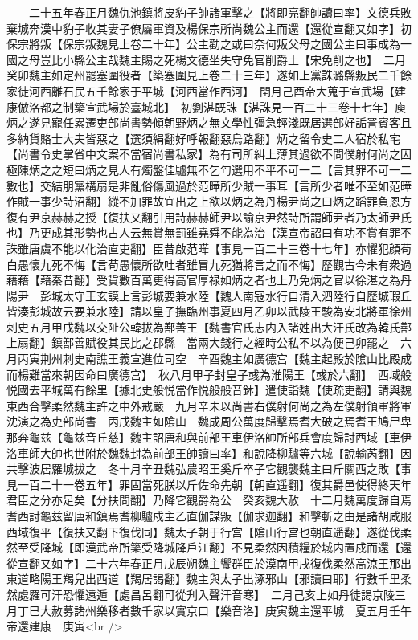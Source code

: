 　　二十五年春正月魏仇池鎮將皮豹子帥諸軍擊之【將即亮翻帥讀曰率】文德兵敗棄城奔漢中豹子收其妻子僚屬軍資及楊保宗所尚魏公主而還【還從宣翻又如字】初保宗將叛【保宗叛魏見上卷二十年】公主勸之或曰奈何叛父母之國公主曰事成為一國之母豈比小縣公主哉魏主賜之死楊文德坐失守免官削爵土【宋免削之也】　二月癸卯魏主如定州罷塞圍役者【築塞圍見上卷二十三年】遂如上黨誅潞縣叛民二千餘家徙河西離石民五千餘家于平城【河西當作西河】　閏月己酉帝大蒐于宣武場【建康倣洛都之制築宣武場於臺城北】　初劉湛既誅【湛誅見一百二十三卷十七年】庾炳之遂見寵任累遷吏部尚書勢傾朝野炳之無文學性彊急輕淺既居選部好詬詈賓客且多納貨賂士大夫皆惡之【選須絹翻好呼報翻惡烏路翻】炳之留令史二人宿於私宅【尚書令史掌省中文案不當宿尚書私家】為有司所糾上薄其過欲不問僕射何尚之因極陳炳之之短曰炳之見人有燭盤佳驢無不乞匄選用不平不可一二【言其罪不可一二數也】交結朋黨構扇是非亂俗傷風過於范曄所少賊一事耳【言所少者唯不至如范曄作賊一事少詩沼翻】縱不加罪故宜出之上欲以炳之為丹楊尹尚之曰炳之蹈罪負恩方復有尹京赫赫之授【復扶又翻引用詩赫赫師尹以諭京尹然詩所謂師尹者乃太師尹氏也】乃更成其形勢也古人云無賞無罰雖堯舜不能為治【漢宣帝詔曰有功不賞有罪不誅雖唐虞不能以化治直吏翻】臣昔啟范曄【事見一百二十三卷十七年】亦懼犯顔苟白愚懷九死不悔【言苟愚懷所欲吐者雖冒九死猶將言之而不悔】歷觀古今未有衆過藉藉【藉秦昔翻】受貨數百萬更得高官厚禄如炳之者也上乃免炳之官以徐湛之為丹陽尹　彭城太守王玄謨上言彭城要兼水陸【魏人南寇水行自清入泗陸行自歷城瑕丘皆湊彭城故云要兼水陸】請以皇子撫臨州事夏四月乙卯以武陵王駿為安北將軍徐州刺史五月甲戌魏以交阯公韓拔為鄯善王【魏書官氏志内入諸姓出大汗氏改為韓氏鄯上扇翻】鎮鄯善賦役其民比之郡縣　當兩大錢行之經時公私不以為便己卯罷之　六月丙寅荆州刺史南譙王義宣進位司空　辛酉魏主如廣德宫【魏主起殿於隂山比殿成而楊難當來朝因命曰廣德宫】　秋八月甲子封皇子彧為淮陽王【彧於六翻】　西域般悦國去平城萬有餘里【據北史般悦當作悦般般音鉢】遣使詣魏【使疏吏翻】請與魏東西合擊柔然魏主許之中外戒嚴　九月辛未以尚書右僕射何尚之為左僕射領軍將軍沈演之為吏部尚書　丙戌魏主如隂山　魏成周公萬度歸擊焉耆大破之焉耆王鳩尸卑那奔龜兹【龜兹音丘慈】魏主詔唐和與前部王車伊洛帥所部兵會度歸討西域【車伊洛車師大帥也世附於魏魏封為前部王帥讀曰率】和說降柳驢等六城【說輸芮翻】因共擊波居羅城拔之　冬十月辛丑魏弘農昭王奚斤卒子它觀襲魏主曰斤關西之敗【事見一百二十一卷五年】罪固當死朕以斤佐命先朝【朝直遥翻】復其爵邑使得終天年君臣之分亦足矣【分扶問翻】乃降它觀爵為公　癸亥魏大赦　十二月魏萬度歸自焉耆西討龜兹留唐和鎮焉耆柳驢戍主乙直伽謀叛【伽求迦翻】和擊斬之由是諸胡咸服西域復平【復扶又翻下復伐同】魏太子朝于行宫【隂山行宫也朝直遥翻】遂從伐柔然至受降城【即漢武帝所築受降城降戶江翻】不見柔然因積糧於城内置戍而還【還從宣翻又如字】二十六年春正月戊辰朔魏主饗群臣於漠南甲戌復伐柔然高涼王那出東道略陽王羯兒出西道【羯居謁翻】魏主與太子出涿邪山【邪讀曰耶】行數千里柔然處羅可汗恐懼遠遁【處昌呂翻可從刋入聲汗音寒】　二月己亥上如丹徒謁京陵三月丁巳大赦募諸州樂移者數千家以實京口【樂音洛】庚寅魏主還平城　夏五月壬午帝還建康　庚寅<br />
